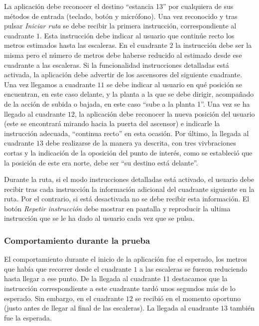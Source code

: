 La aplicación debe reconocer el destino ``estancia 13'' por cualquiera de sus métodos de entrada (teclado, botón y micrófono). Una vez reconocido y tras pulsar \textit{Iniciar ruta} se debe recibir la primera instrucción, correspondiente al cuadrante $1$. Esta instrucción debe indicar al usuario que continúe recto los metros estimados hasta las escaleras. En el cuadrante $2$ la instrucción debe ser la misma pero el número de metros debe haberse reducido al estimado desde ese cuadrante a las escaleras. Si la funcionalidad instrucciones detalladas está activada, la aplicación debe advertir de los ascensores del siguiente cuadrante. Una vez llegamos a cuadrante $11$ se debe indicar al usuario en qué posición se encuentran, en este caso delante, y la planta a la que se debe dirigir, acompañado de la acción de subida o bajada, en este caso ``sube a la planta 1''. Una vez se ha llegado al cuadrante $12$, la aplicación debe reconocer la nueva posición del usuario (este se encontrará mirando hacia la puerta del ascensor) e indicarle la instrucción adecuada, ``continua recto'' en esta ocasión. Por último, la llegada al cuadrante $13$ debe realizarse de la manera ya descrita, con tres vivbraciones cortas y la indicación de la oposición del punto de interés, como se estableció que la posición de este era norte, debe ser ``su destino está delante''. 

Durante la ruta, si el modo instrucciones detalladas está activado, el usuario debe recibir tras cada instrucción la información adicional del cuadrante siguiente en la ruta. Por el contrario, si está desactivada no se debe recibir esta información. El botón \textit{Repetir instrucción} debe mostrar en pantalla y reproducir la ultima instrucción que se le ha dado al usuario cada vez que se pulsa. 


\subsubsection*{Comportamiento durante la prueba}

El comportamiento durante el inicio de la aplicación fue el esperado, los metros que había que recorrer desde el cuadrante $1$ a las escaleras se fueron reduciendo hasta llegar a ese punto. De la llegada al cuadrante $11$ destacamos que la instrucción correspondiente a este cuadrante tardó unos segundos más de lo esperado. Sin embargo, en el cuadrante $12$ se recibió en el momento oportuno (justo antes de llegar al final de las escaleras). La llegada al cuadrante $13$ también fue la esperada. 


